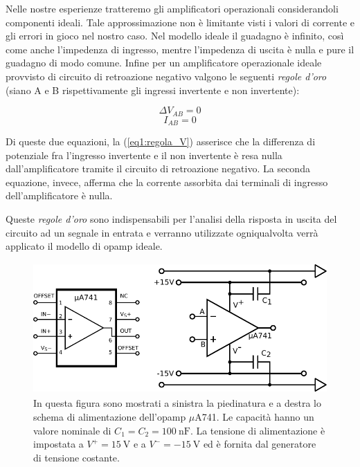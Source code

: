 Nelle nostre esperienze tratteremo gli amplificatori operazionali considerandoli componenti ideali. Tale approssimazione non è limitante visti i valori di corrente e gli errori in gioco nel nostro caso.
Nel modello ideale il guadagno è infinito, così come anche l'impedenza di ingresso, mentre l'impedenza di uscita è nulla e pure il guadagno di modo comune.
Infine per un amplificatore operazionale ideale provvisto di circuito di retroazione negativo valgono le seguenti \textit{regole d'oro} (siano A e B rispettivamente gli ingressi invertente e non invertente):

\begin{equation}
	\Delta V_{AB}=0
	\label{eq1:regola_V}
\end{equation}
\begin{equation}
	I_{AB}=0
	\label{eq1:regola_I}
\end{equation}

Di queste due equazioni, la (\ref{eq1:regola_V}) asserisce che la differenza di potenziale fra l'ingresso invertente e il non invertente è resa nulla dall'amplificatore tramite il circuito di retroazione negativo.
La seconda equazione, invece, afferma che la corrente assorbita dai terminali di ingresso dell'amplificatore è nulla.

Queste \textit{regole d'oro} sono indispensabili per l'analisi della risposta in uscita del circuito ad un segnale in entrata e verranno utilizzate ogniqualvolta verrà applicato il modello di opamp ideale.

\begin{figure}
\centering
\includegraphics[height=5.0cm]{../E01/latex/uA741+PWR.pdf}
	\caption{In questa figura sono mostrati a sinistra la piedinatura e a destra lo schema di alimentazione dell'opamp $\mu$A741. Le capacità hanno un valore nominale di $C_1=C_2= \SI{100}{\nano\farad}$. La tensione di alimentazione è impostata a $V^+ = \SI{15}{\volt}$ e a $V^- = \SI{-15}{\volt}$ ed è fornita dal generatore di tensione costante.}
\label{cir1:PWR}
\end{figure}


